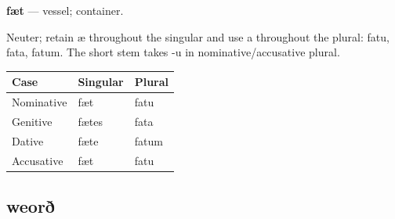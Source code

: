 \par\begin{minipage}{\linewidth}\raggedright
\textbf{fæt} — vessel; container.

Neuter; retain æ throughout the singular and use a throughout the plural: fatu, fata, fatum. The short stem takes -u in nominative/\allowbreak{}accusative plural.

\par\begingroup
\fontsize{10.5}{13.2}\selectfont
\setlength{\LTleft}{0pt}\setlength{\LTright}{\fill}
\noindent
\begin{tabular}{@{}>{\raggedright\arraybackslash}p{39.46mm}>{\raggedright\arraybackslash}p{39.46mm}>{\raggedright\arraybackslash}p{39.46mm}@{}}
\toprule
\textbf{Case} & \textbf{Singular} & \textbf{Plural} \\
\midrule
Nominative & fæt & fatu \\
Genitive & fætes & fata \\
Dative & fæte & fatum \\
Accusative & fæt & fatu \\
\bottomrule
\end{tabular}
\par\endgroup

\end{minipage}\par
{}
\subsection*{weorð}

